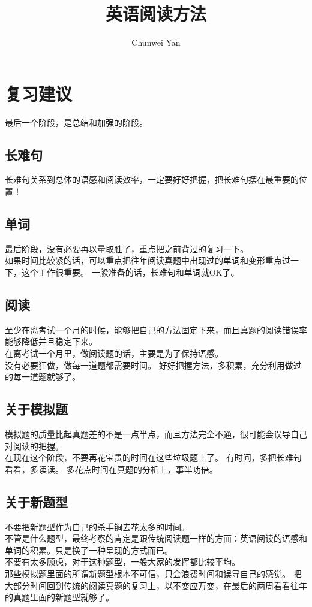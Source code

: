 \documentclass[a4paper]{ctexart}
\author{Chunwei Yan}
\title{英语阅读方法}
\begin{document}
    \maketitle

\section{复习建议}
最后一个阶段，是总结和加强的阶段。
\subsection{长难句}
长难句关系到总体的语感和阅读效率，一定要好好把握，把长难句摆在最重要的位置！
\subsection{单词}
最后阶段，没有必要再以量取胜了，重点把之前背过的复习一下。\\
如果时间比较紧的话，可以重点把往年阅读真题中出现过的单词和变形重点过一下，这个工作很重要。 一般准备的话，长难句和单词就OK了。
\subsection{阅读}
至少在离考试一个月的时候，能够把自己的方法固定下来，而且真题的阅读错误率能够降低并且稳定下来。\\
在离考试一个月里，做阅读题的话，主要是为了保持语感。\\ 
没有必要狂做，做每一道题都需要时间。 好好把握方法，多积累，充分利用做过的每一道题就够了。

\subsection{关于模拟题}
模拟题的质量比起真题差的不是一点半点，而且方法完全不通，很可能会误导自己对阅读的把握。\\
在现在这个阶段，不要再花宝贵的时间在这些垃圾题上了。 有时间，多把长难句看看，多读读。 多花点时间在真题的分析上，事半功倍。

\subsection{关于新题型}
不要把新题型作为自己的杀手锏去花太多的时间。 \\
不管是什么题型，最终考察的肯定是跟传统阅读题一样的方面：英语阅读的语感和单词的积累。只是换了一种呈现的方式而已。\\
不要有太多顾虑，对于这种题型，一般大家的发挥都比较平均。 \\
那些模拟题里面的所谓新题型根本不可信，只会浪费时间和误导自己的感觉。 把大部分时间回到传统的阅读真题的复习上，以不变应万变，在最后的两周看看往年的真题里面的新题型就够了。
\end{document}
